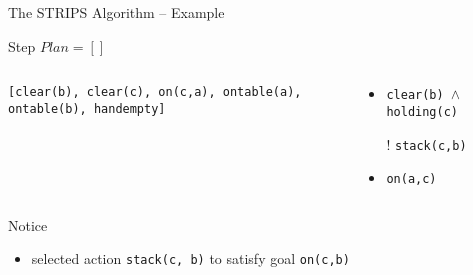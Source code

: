 \documentclass[presentation]{beamer}\mode<presentation>{\usetheme{AMSBolognaFC}}
\begin{document}
\begin{frame}[c]{The STRIPS Algorithm -- Example}
\small

    \begin{exampleblock}{Step \nextStripsExampleStep{} \hfill $Plan = []$}
        \begin{columns}[t]
            \begin{column}{.30\linewidth}\centering
                \texttt{[clear(b), clear(c), on(c,a), ontable(a), ontable(b), handempty]}
            \end{column}
            \begin{column}{.50\linewidth}\centering
                \begin{itemize}
                    \item \texttt{clear(b) $\wedge$ holding(c)}
                    \item[!] \texttt{stack(c,b)}
                    \item \texttt{on(a,c)}
                \end{itemize}
            \end{column}
            \begin{column}{.10\linewidth}\centering
                
            \end{column}
        \end{columns}
    \end{exampleblock}

    \vfill

    \footnotesize
    Notice
    \begin{itemize}\tiny
        \item selected action \texttt{stack(c, b)} to satisfy goal \texttt{on(c,b)}
    \end{itemize}

\end{frame}
\end{document}
